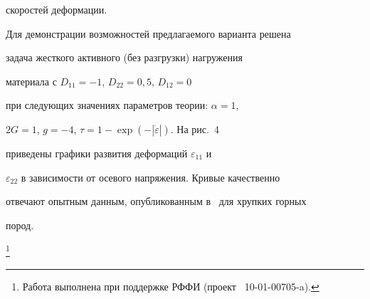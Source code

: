 скоростей деформации.







Для демонстрации возможностей предлагаемого варианта решена

задача жесткого активного (без разгрузки) нагружения

материала с $D_{11}=-1$, $D_{22}=0,5$, $D_{12}=0$

при следующих значениях параметров теории: $\alpha=1$,

$2G=1$, \mbox{$g=-4$}, $\tau=1-\exp(-|\dot{\varepsilon}|)$. На рис.~4

приведены графики развития деформаций $\varepsilon_{11}$ и

$\varepsilon_{22}$ в зависимости от осевого напряжения. Кривые качественно

отвечают опытным данным, опубликованным в~\cite{Linkov-89} для хрупких горных

пород.



\thanks{Работа выполнена при поддержке РФФИ (проект \No~10-01-00705-a).}



\vspace{-3mm}



